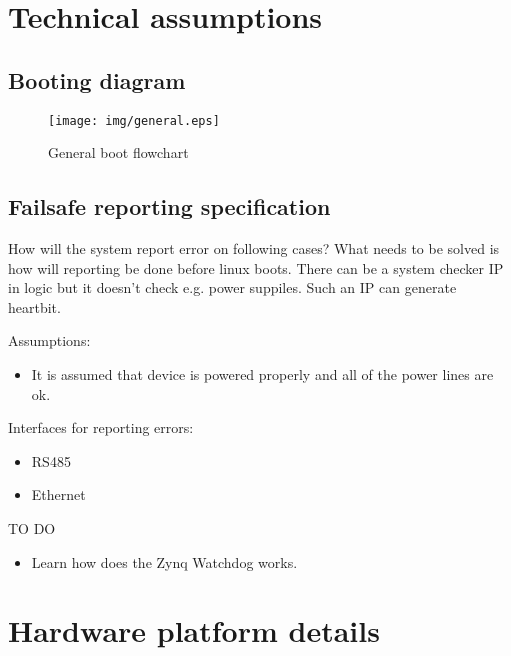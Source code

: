 \documentclass[twoside,a4paper]{refart}
\begin{document}
\newpage
\section{Technical assumptions}

\subsection{Booting diagram}

\begin{figure}[!htb]
\texttt{[image: img/general.eps]}

\caption{General boot flowchart}
\label{fig:digraph}
\end{figure}


\subsection{Failsafe reporting specification}

How will the system report error on following cases? 
What needs to be solved is how will reporting be done before linux boots.
There can be a system checker IP in logic but it doesn't check e.g. power suppiles. Such an IP can generate heartbit. 

Assumptions:
\begin{itemize}
\item It is assumed that device is powered properly and all of the power lines
are ok.
\end{itemize}

Interfaces for reporting errors:
\begin{itemize}
\item RS485
\item Ethernet

\end{itemize}

TO DO
\begin{itemize}
\item Learn how does the Zynq Watchdog works. 
\end{itemize}


\newpage
\section{Hardware platform details}
\end{document}
